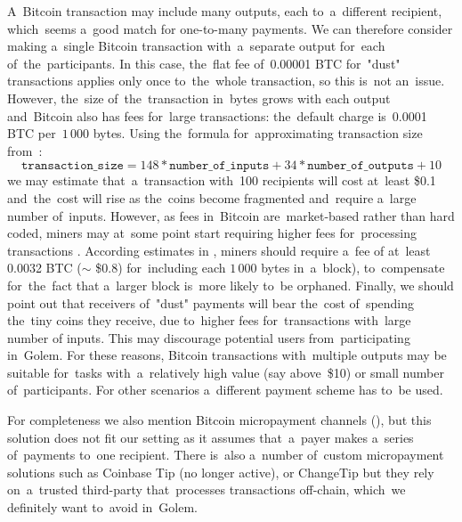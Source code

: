 \documentclass[a4paper]{article}
\newcommand{\BTC}{BTC}%
\begin{document}
    A~Bitcoin transaction may include many outputs, each to~a~different recipient, which~seems a~good match for
    one-to-many payments. We can therefore consider making a~single Bitcoin transaction with~a~separate output
    for~each of~the~participants. In this case, the~flat fee of~0.00001 \BTC{} for~"dust" transactions applies only
    once to~the~whole transaction, so this  is~not an~issue. However, the~size of~the~transaction in~bytes grows with
    each output and~Bitcoin also has fees for~large transactions: the~default charge  is~0.0001 \BTC{} per~$1\,000$ bytes.
    Using the~formula for~approximating transaction size from~\cite{BITFEE}:
    \begin{displaymath}
      \texttt{transaction\_size} = 148 * \texttt{number\_of\_inputs} + 34 * \texttt{number\_of\_outputs} + 10
    \end{displaymath}
    we may estimate that~a~transaction with~100 recipients will cost at~least \$0.1 and~the~cost will rise as the~coins
    become fragmented and~require a~large number of~inputs. However, as fees in~Bitcoin are~market-based rather than
    hard coded, miners may at~some point start requiring higher fees for~processing transactions \cite{KASKALOGLU}.
    According estimates in \cite{ANDRESEN}, miners should require a~fee of
    at~least 0.0032 \BTC{} ($\sim$ \$0.8) for~including each $1\,000$ bytes in~a~block), to~compensate for~the~fact that
    a~larger block  is~more likely to~be orphaned. Finally, we should point out that receivers of~"dust" payments will
    bear the~cost of~spending the~tiny coins they receive, due to~higher fees for~transactions with~large number of
    inputs. This may discourage potential users from~participating in~Golem. For these reasons, Bitcoin transactions
    with~multiple outputs may be suitable for~tasks with~a~relatively high value (say above~\$10) or small number
    of~participants. For other scenarios a~different payment scheme has to~be used.

    For completeness we also mention Bitcoin micropayment channels (\cite{BITCOINJ}), but this solution does not fit
    our setting as it assumes that~a~payer makes a~series of~payments to~one recipient.
    There  is~also a~number of~custom micropayment solutions such as Coinbase Tip \cite{COINTIP}(no longer active),
    or ChangeTip \cite{CHANGETIP} but they rely on~a~trusted third-party that~processes transactions off-chain,
    which~we definitely want to~avoid in~Golem.
\end{document}
